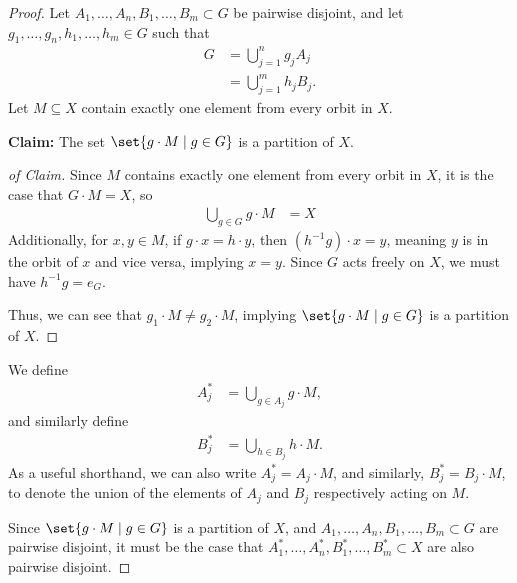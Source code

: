 \begin{proof}
  Let $A_1,\dots,A_n,B_1,\dots,B_m\subset G$ be pairwise disjoint, and let $g_1,\dots,g_n,h_1,\dots,h_m\in G$ such that
  \begin{align*}
    G &= \bigcup_{j=1}^{n}g_jA_j\\
      &= \bigcup_{j=1}^{m}h_jB_j.
  \end{align*}
  Let $M\subseteq X$ contain exactly one element from every orbit in $X$.\newline

  \textbf{Claim:} The set $\set{g\cdot M\mid g\in G}$ is a partition of $X$.\\
  \vspace{12pt}
  \begin{proof}[of Claim]
  Since $M$ contains exactly one element from every orbit in $X$, it is the case that $G\cdot M = X$, so
  \begin{align*}
    \bigcup_{g\in G} g\cdot M &= X
  \end{align*}
  Additionally, for $x,y\in M$, if $g\cdot x = h\cdot y$, then $\left(h^{-1}g\right)\cdot x = y$, meaning $y$ is in the orbit of $x$ and vice versa, implying $x = y$. Since $G$ acts freely on $X$, we must have $h^{-1}g = e_G$.\newline

  Thus, we can see that $g_1\cdot M \neq g_2\cdot M$, implying $\set{g\cdot M\mid g\in G}$ is a partition of $X$.
  \end{proof}
  We define
  \begin{align*}
    A_j^{\ast} &= \bigcup_{g\in A_j}g\cdot M,
  \end{align*}
  and similarly define
  \begin{align*}
    B_j^{\ast} &= \bigcup_{h\in B_j}h\cdot M.
  \end{align*}
  As a useful shorthand, we can also write $A_j^{\ast} = A_j\cdot M$, and similarly, $B_j^{\ast} = B_j\cdot M$, to denote the union of the elements of $A_j$ and $B_j$ respectively acting on $M$.\newline

  Since $\set{g\cdot M\mid g\in G}$ is a partition of $X$, and $A_1,\dots,A_n,B_1,\dots,B_m\subset G$ are pairwise disjoint, it must be the case that $A_1^{\ast},\dots,A_n^{\ast},B_1^{\ast},\dots,B_m^{\ast}\subset X$ are also pairwise disjoint.\newline


\end{proof}
